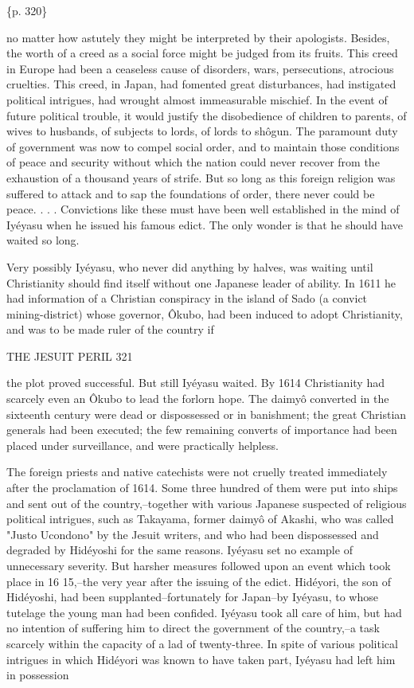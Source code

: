 \{p. 320\}

no matter how astutely they might be interpreted by their apologists. Besides, the worth of a creed as a social force might be judged from its fruits. This creed in Europe had been a ceaseless cause of disorders, wars, persecutions, atrocious cruelties. This creed, in Japan, had fomented great disturbances, had instigated political intrigues, had wrought almost immeasurable mischief. In the event of future political trouble, it would justify the disobedience of children to parents, of wives to husbands, of subjects to lords, of lords to shôgun. The paramount duty of government was now to compel social order, and to maintain those conditions of peace and security without which the nation could never recover from the exhaustion of a thousand years of strife. But so long as this foreign religion was suffered to attack and to sap the foundations of order, there never could be peace. . . . Convictions like these must have been well established in the mind of Iyéyasu when he issued his famous edict. The only wonder is that he should have waited so long.

Very possibly Iyéyasu, who never did anything by halves, was waiting until Christianity should find itself without one Japanese leader of ability. In 1611 he had information of a Christian conspiracy in the island of Sado (a convict mining-district) whose governor, Ôkubo, had been induced to adopt Christianity, and was to be made ruler of the country if

THE JESUIT PERIL 321

the plot proved successful. But still Iyéyasu waited. By 1614 Christianity had scarcely even an Ôkubo to lead the forlorn hope. The daimyô converted in the sixteenth century were dead or dispossessed or in banishment; the great Christian generals had been executed; the few remaining converts of importance had been placed under surveillance, and were practically helpless.

The foreign priests and native catechists were not cruelly treated immediately after the proclamation of 1614. Some three hundred of them were put into ships and sent out of the country,--together with various Japanese suspected of religious political intrigues, such as Takayama, former daimyô of Akashi, who was called "Justo Ucondono" by the Jesuit writers, and who had been dispossessed and degraded by Hidéyoshi for the same reasons. Iyéyasu set no example of unnecessary severity. But harsher measures followed upon an event which took place in 16 15,--the very year after the issuing of the edict. Hidéyori, the son of Hidéyoshi, had been supplanted--fortunately for Japan--by Iyéyasu, to whose tutelage the young man had been confided. Iyéyasu took all care of him, but had no intention of suffering him to direct the government of the country,--a task scarcely within the capacity of a lad of twenty-three. In spite of various political intrigues in which Hidéyori was known to have taken part, Iyéyasu had left him in possession

